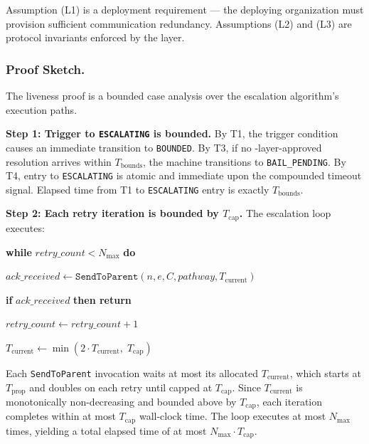 Assumption (L1) is a deployment requirement — the deploying organization must provision sufficient communication redundancy. Assumptions (L2) and (L3) are protocol invariants enforced by the \fact{} layer.

\subsubsection{Proof Sketch.}

The liveness proof is a bounded case analysis over the escalation algorithm's execution paths.

\medskip
\noindent\textbf{Step 1: Trigger to \texttt{ESCALATING} is bounded.} By T1, the trigger condition causes an immediate transition to \texttt{BOUNDED}. By T3, if no \fact-layer-approved resolution arrives within $T_{\text{bounds}}$, the machine transitions to \texttt{BAIL\_PENDING}. By T4, entry to \texttt{ESCALATING} is atomic and immediate upon the compounded timeout signal. Elapsed time from T1 to \texttt{ESCALATING} entry is exactly $T_{\text{bounds}}$.

\medskip
\noindent\textbf{Step 2: Each retry iteration is bounded by $T_{\text{cap}}$.} The escalation loop executes:

\begin{trivlist}\itemsep=0pt
\item[]\textbf{while} $retry\_count < N_{\max}$ \textbf{do}
\item[]\hspace{1em}$ack\_received \leftarrow \texttt{SendToParent}(n, e, C, pathway, T_{\text{current}})$
\item[]\hspace{1em}\textbf{if} $ack\_received$ \textbf{then return}
\item[]\hspace{1em}$retry\_count \leftarrow retry\_count + 1$
\item[]\hspace{1em}$T_{\text{current}} \leftarrow \min(2 \cdot T_{\text{current}},\; T_{\text{cap}})$
\end{trivlist}

Each \texttt{SendToParent} invocation waits at most its allocated $T_{\text{current}}$, which starts at $T_{\text{prop}}$ and doubles on each retry until capped at $T_{\text{cap}}$. Since $T_{\text{current}}$ is monotonically non-decreasing and bounded above by $T_{\text{cap}}$, each iteration completes within at most $T_{\text{cap}}$ wall-clock time. The loop executes at most $N_{\max}$ times, yielding a total elapsed time of at most $N_{\max} \cdot T_{\text{cap}}$.

